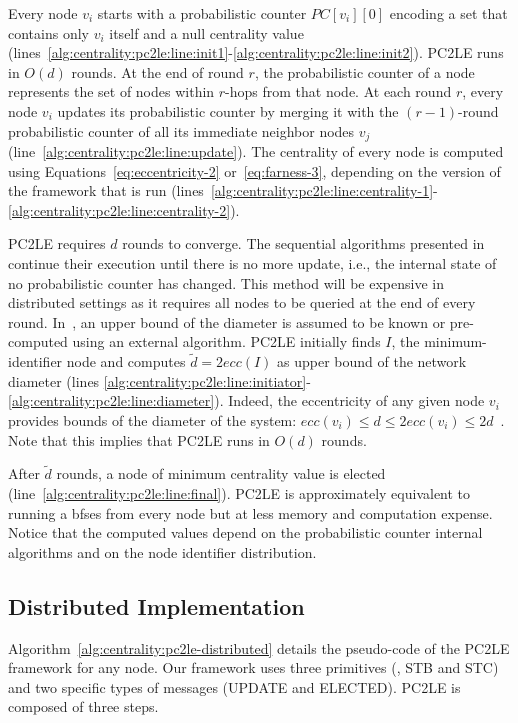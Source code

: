 Every node $v_i$ starts with a probabilistic counter $PC[v_i][0]$ encoding a set that contains only $v_i$ itself and a null centrality value (lines~\ref{alg:centrality:pc2le:line:init1}-\ref{alg:centrality:pc2le:line:init2}). PC2LE runs in $O(d)$ rounds. At the end of round $r$, the probabilistic counter of a node represents the set of nodes within $r$-hops from that node. At each round $r$, every node $v_i$ updates its probabilistic counter by merging it with the $(r-1)$-round probabilistic counter of all its immediate neighbor nodes $v_j$ (line~\ref{alg:centrality:pc2le:line:update}). The centrality of every node is computed using Equations~\eqref{eq:eccentricity-2} or~\eqref{eq:farness-3}, depending on the version of the framework that is run (lines~\ref{alg:centrality:pc2le:line:centrality-1}-\ref{alg:centrality:pc2le:line:centrality-2}). 

PC2LE requires $d$ rounds to converge. The sequential algorithms presented in~\cite{kang2011centralities,kang2011hadi} continue their execution until there is no more update, i.e., the internal state of no probabilistic counter has changed. This method will be expensive in distributed settings as it requires all nodes to be queried at the end of every round. In~\cite{garin2012distributed}, an upper bound of the diameter is assumed to be known or pre-computed using an external algorithm. PC2LE initially finds $I$, the minimum-identifier node and computes $\tilde{d} = 2ecc(I)$ as upper bound of the network diameter (lines \ref{alg:centrality:pc2le:line:initiator}-\ref{alg:centrality:pc2le:line:diameter}). Indeed, the eccentricity of any given node $v_i$ provides bounds of the diameter of the system:  $ecc(v_i) \leq d \leq 2ecc(v_i) \leq 2d$~\cite{magnien2009fast}. Note that this implies that PC2LE runs in $O(d)$ rounds.

After $\tilde{d}$ rounds, a node of minimum centrality value is elected (line~\ref{alg:centrality:pc2le:line:final}). PC2LE is approximately equivalent to running a \gls{bfses} from every node but at less memory and computation expense. Notice that the computed values depend on the probabilistic counter internal algorithms and on the node identifier distribution.

\subsection{Distributed Implementation}
\label{section:centrality:pc2le-distributed-implementation}

Algorithm~\ref{alg:centrality:pc2le-distributed} details the pseudo-code of the PC2LE framework for any node. Our framework uses three primitives (\cheungIeCbAgg{}, STB and STC) and two specific types of messages (UPDATE and ELECTED). PC2LE is composed of three steps.


